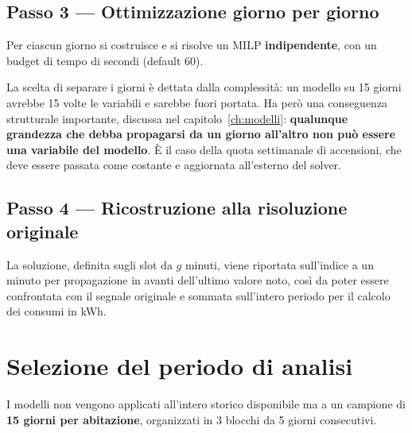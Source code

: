 \subsection*{Passo 3 --- Ottimizzazione giorno per giorno}

Per ciascun giorno si costruisce e si risolve un MILP \textbf{indipendente}, con un budget di
tempo di  secondi (default 60).

La scelta di separare i giorni è dettata dalla complessità: un modello su 15 giorni avrebbe 15
volte le variabili e sarebbe fuori portata. Ha però una conseguenza strutturale importante,
discussa nel capitolo~\ref{ch:modelli}: \textbf{qualunque grandezza che debba propagarsi da un
giorno all'altro non può essere una variabile del modello}. È il caso della quota settimanale di
accensioni, che deve essere passata come costante e aggiornata all'esterno del solver.

\subsection*{Passo 4 --- Ricostruzione alla risoluzione originale}

La soluzione, definita sugli slot da $g$ minuti, viene riportata sull'indice a un minuto per
propagazione in avanti dell'ultimo valore noto, così da poter essere confrontata con il segnale
originale e sommata sull'intero periodo per il calcolo dei consumi in kWh.

\section{Selezione del periodo di analisi}

I modelli non vengono applicati all'intero storico disponibile ma a un campione di
\textbf{15 giorni per abitazione}, organizzati in 3 blocchi da 5 giorni consecutivi.

